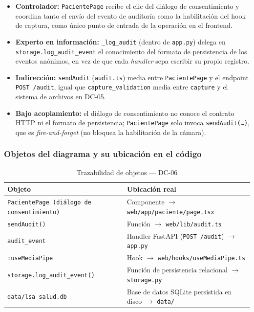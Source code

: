 \begin{itemize}[leftmargin=*, itemsep=2pt]
    \item \textbf{Controlador:} \texttt{PacientePage} recibe el clic del
    diálogo de consentimiento y coordina tanto el envío del evento de
    auditoría como la habilitación del hook de captura, como único punto
    de entrada de la operación en el frontend.
    \item \textbf{Experto en información:} \texttt{\_log\_audit} (dentro de
    \texttt{app.py}) delega en \texttt{storage.log\_audit\_event} el
    conocimiento del formato de persistencia de los eventos anónimos, en
    vez de que cada \textit{handler} sepa escribir su propio registro.
    \item \textbf{Indirección:} \texttt{sendAudit} (\texttt{audit.ts}) media
    entre \texttt{PacientePage} y el endpoint \texttt{POST /audit}, igual
    que \texttt{capture\_validation} media entre \texttt{capture} y el
    sistema de archivos en DC-05.
    \item \textbf{Bajo acoplamiento:} el diálogo de consentimiento no conoce
    el contrato HTTP ni el formato de persistencia; \texttt{PacientePage}
    solo invoca \texttt{sendAudit(\ldots)}, que es \textit{fire-and-forget}
    (no bloquea la habilitación de la cámara).
\end{itemize}

\subsubsection{Objetos del diagrama y su ubicación en el código}

\begin{table}[H]
\centering
\begin{tabularx}{\textwidth}{@{}l X@{}}
\toprule
\textbf{Objeto} & \textbf{Ubicación real} \\
\midrule
\texttt{PacientePage (diálogo de consentimiento)} & Componente $\rightarrow$ \texttt{web/app/paciente/page.tsx} \\
\texttt{sendAudit()} & Función $\rightarrow$ \texttt{web/lib/audit.ts} \\
\texttt{audit\_event} & Handler FastAPI (\texttt{POST /audit}) $\rightarrow$ \texttt{app.py} \\
\texttt{:useMediaPipe} & Hook $\rightarrow$ \texttt{web/hooks/useMediaPipe.ts} \\
\texttt{storage.log\_audit\_event()} & Función de persistencia relacional $\rightarrow$ \texttt{storage.py} \\
\texttt{data/lsa\_salud.db} & Base de datos SQLite persistida en disco $\rightarrow$ \texttt{data/} \\
\bottomrule
\end{tabularx}
\caption{Trazabilidad de objetos --- DC-06}
\label{tab:col-objetos-dc06}
\end{table}

